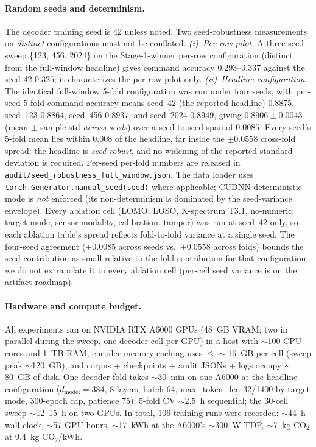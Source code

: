 \documentclass[sensors,article,submit,moreauthors,pdftex]{Definitions/mdpi}
\begin{document}
\paragraph{Random seeds and determinism.}
\label{app3:repro-seeds}
The decoder training seed is 42 unless noted. Two seed-robustness measurements on \emph{distinct} configurations must not be conflated. \emph{(i)~Per-row pilot.} A three-seed sweep \{123, 456, 2024\} on the Stage-1-winner per-row configuration (distinct from the full-window headline) gives command accuracy $0.293$--$0.337$ against the seed-42 $0.325$; it characterizes the per-row pilot only. \emph{(ii)~Headline configuration.} The identical full-window 5-fold configuration was run under
four seeds, with per-seed 5-fold command-accuracy means seed~42 (the reported headline) $0.8875$, seed~123
$0.8864$, seed~456 $0.8937$, and seed~2024 $0.8949$, giving $0.8906 \pm 0.0043$ (mean $\pm$ sample std
\emph{across seeds}) over a seed-to-seed span of $0.0085$. Every seed's 5-fold mean lies within $0.008$ of the headline, far inside the $\pm 0.0558$ cross-fold spread: the headline is \emph{seed-robust}, and no widening of the reported standard deviation is required. Per-seed per-fold numbers are released in
\texttt{audit/\allowbreak seed\_robustness\_full\_window.json}. The data loader uses \texttt{torch.Generator.manual\_seed(seed)} where applicable; CUDNN deterministic mode is \emph{not} enforced (its non-determinism is dominated by the seed-variance envelope). Every ablation cell (LOMO, LOSO, K-spectrum T3.1, no-numeric, target-mode, sensor-modality, calibration, tamper) was run at seed~42 only, so each ablation table's spread reflects fold-to-fold variance at a single seed. The four-seed agreement ($\pm 0.0085$ across seeds vs.\ $\pm 0.0558$ across folds) bounds the seed contribution as small relative to the fold contribution for that configuration; we do not extrapolate it to every ablation cell (per-cell seed variance is on the artifact roadmap).

\paragraph{Hardware and compute budget.}
\label{app3:repro-hardware}
All experiments ran on NVIDIA RTX A6000 GPUs (48~GB VRAM; two in parallel during the sweep, one decoder cell per GPU) in a host with $\sim$100 CPU cores and 1~TB RAM; encoder-memory caching uses $\le\!\sim$16~GB per cell (sweep peak $\sim$120~GB), and corpus + checkpoints + audit JSONs + logs occupy $\sim$80~GB of disk. One decoder fold takes $\sim$30~min on one A6000 at the headline configuration ($d_{\text{model}}=384$, 8 layers, batch 64, max\_token\_len 32/1400 by target mode, 300-epoch cap, patience 75); 5-fold CV $\sim$2.5~h sequential; the 30-cell sweep $\sim$12--15~h on two GPUs. In total, 106 training runs were recorded: $\sim$44~h wall-clock, $\sim$57 GPU-hours, $\sim$17~kWh at the A6000's $\sim$300~W TDP, $\sim$7~kg CO$_2$ at 0.4~kg CO$_2$/kWh.
\end{document}
